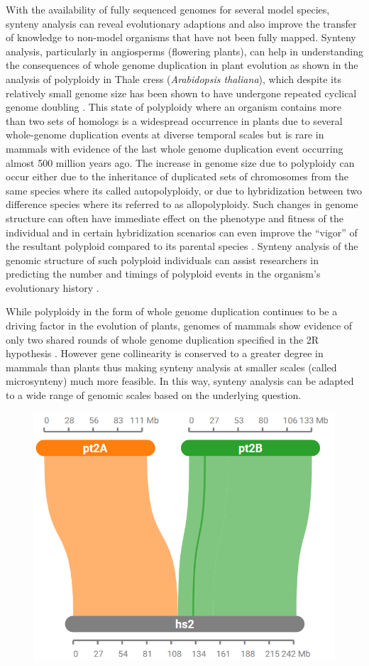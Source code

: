 With the availability of fully sequenced genomes for several model species, synteny analysis can reveal evolutionary adaptions and also improve the transfer of knowledge to non-model organisms that have not been fully mapped\cite{zhao2019network}. Synteny analysis, particularly in angiosperms (flowering plants), can help in understanding the consequences of whole genome duplication in plant evolution\cite{adams2005polyploidy} as shown in the analysis of polyploidy in Thale cress (\textit{Arabidopsis thaliana}), which despite its relatively small genome size has been shown to have undergone repeated cyclical genome doubling \cite{seoighe2004genome,seoighe2003turning}. This state of polyploidy where an organism contains more than two sets of homologs is a widespread occurrence in plants  due to several whole-genome duplication events at diverse temporal scales but is rare in mammals with evidence of the last whole genome duplication event occurring almost 500 million years ago\cite{adams2005polyploidy,panopoulou2005timing}. The increase in genome size due to polyploidy can occur either due to the inheritance of duplicated sets of chromosomes from the same species where its called autopolyploidy, or due to hybridization between two difference species where its referred to as allopolyploidy. Such changes in genome structure can often have immediate effect on the phenotype and fitness of the individual and in certain hybridization scenarios can even improve the ``vigor'' of the resultant polyploid compared to its parental species \cite{otto2007evolutionary}. Synteny analysis of the genomic structure of such polyploid individuals can assist researchers in predicting the number and timings of polyploid events in the organism's evolutionary history \cite{adams2005polyploidy}. 

While polyploidy in the form of whole genome duplication continues to be a driving factor in the evolution of plants, genomes of mammals show evidence of only two shared rounds of whole genome duplication specified in the 2R hypothesis \cite{hokamp20032r}. However gene collinearity is conserved to a greater degree in mammals than plants thus making synteny analysis at smaller scales (called microsynteny) much more feasible\cite{zhao2019network}. In this way, synteny analysis can be adapted to a wide range of genomic scales based on the underlying question.

\begin{figure}[h]
  \centering
  \includegraphics[width=.35\linewidth]{images/ch_2_fission.PNG}
  \label{fig:ch_2_fission}
\end{figure}


